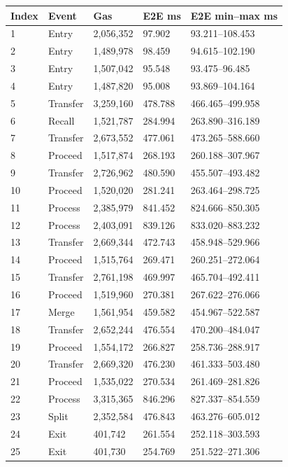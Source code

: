 \documentclass[11pt,a4paper]{extarticle}
\begin{document}
  {\small
    \begin{longtable}{@{}p{}p{}p{}p{}p{}@{}}
      \toprule
      Index & Event    & Gas       & E2E ms  & E2E min--max ms  \\
      \midrule
      \endhead
      1     & Entry    & 2,056,352 & 97.902  & 93.211--108.453  \\
      2     & Entry    & 1,489,978 & 98.459  & 94.615--102.190  \\
      3     & Entry    & 1,507,042 & 95.548  & 93.475--96.485   \\
      4     & Entry    & 1,487,820 & 95.008  & 93.869--104.164  \\
      5     & Transfer & 3,259,160 & 478.788 & 466.465--499.958 \\
      6     & Recall   & 1,521,787 & 284.994 & 263.890--316.189 \\
      7     & Transfer & 2,673,552 & 477.061 & 473.265--588.660 \\
      8     & Proceed  & 1,517,874 & 268.193 & 260.188--307.967 \\
      9     & Transfer & 2,726,962 & 480.590 & 455.507--493.482 \\
      10    & Proceed  & 1,520,020 & 281.241 & 263.464--298.725 \\
      11    & Process  & 2,385,979 & 841.452 & 824.666--850.305 \\
      12    & Process  & 2,403,091 & 839.126 & 833.020--883.232 \\
      13    & Transfer & 2,669,344 & 472.743 & 458.948--529.966 \\
      14    & Proceed  & 1,515,764 & 269.471 & 260.251--272.064 \\
      15    & Transfer & 2,761,198 & 469.997 & 465.704--492.411 \\
      16    & Proceed  & 1,519,960 & 270.381 & 267.622--276.066 \\
      17    & Merge    & 1,561,954 & 459.582 & 454.967--522.587 \\
      18    & Transfer & 2,652,244 & 476.554 & 470.200--484.047 \\
      19    & Proceed  & 1,554,172 & 266.827 & 258.736--288.917 \\
      20    & Transfer & 2,669,320 & 476.230 & 461.333--503.480 \\
      21    & Proceed  & 1,535,022 & 270.534 & 261.469--281.826 \\
      22    & Process  & 3,315,365 & 846.296 & 827.337--854.559 \\
      23    & Split    & 2,352,584 & 476.843 & 463.276--605.012 \\
      24    & Exit     & 401,742   & 261.554 & 252.118--303.593 \\
      25    & Exit     & 401,730   & 254.769 & 251.522--271.306 \\
      \bottomrule
    \end{longtable}
  }
\end{document}
